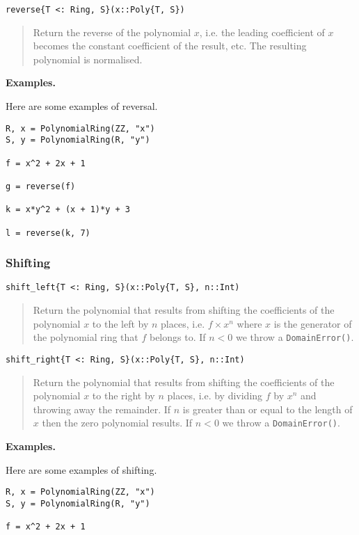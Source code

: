 \documentclass[a4paper,10pt]{article}
\newcommand{\code}{\lstinline}
\newcommand{\desc}[1]{\vspace{-3mm}\begin{quote}#1\end{quote}}
\begin{document}
{{{\begin{lstlisting}
reverse{T <: Ring, S}(x::Poly{T, S})
\end{lstlisting}

\desc{Return the reverse of the polynomial $x$, i.e. the leading coefficient
of $x$ becomes the constant coefficient of the result, etc. The resulting
polynomial is normalised.}

\textbf{Examples.}

Here are some examples of reversal.

\begin{lstlisting}
R, x = PolynomialRing(ZZ, "x")
S, y = PolynomialRing(R, "y")

f = x^2 + 2x + 1

g = reverse(f)

k = x*y^2 + (x + 1)*y + 3

l = reverse(k, 7)
\end{lstlisting}

\subsubsection{Shifting}

\begin{lstlisting}
shift_left{T <: Ring, S}(x::Poly{T, S}, n::Int)
\end{lstlisting}

\desc{Return the polynomial that results from shifting the coefficients of the
polynomial $x$ to the left by $n$ places, i.e. $f\times x^n$ where $x$ is the
generator of the polynomial ring that $f$ belongs to. If $n < 0$ we throw a
\code{DomainError()}.}

\begin{lstlisting}
shift_right{T <: Ring, S}(x::Poly{T, S}, n::Int)
\end{lstlisting}

\desc{Return the polynomial that results from shifting the coefficients of the
polynomial $x$ to the right by $n$ places, i.e. by dividing $f$ by $x^n$ and
throwing away the remainder. If $n$ is greater than or equal to the length of
$x$ then the zero polynomial results. If $n < 0$ we throw a 
\code{DomainError()}.}

\textbf{Examples.}

Here are some examples of shifting.

\begin{lstlisting}
R, x = PolynomialRing(ZZ, "x")
S, y = PolynomialRing(R, "y")

f = x^2 + 2x + 1


\end{lstlisting}}}}
\end{document}
